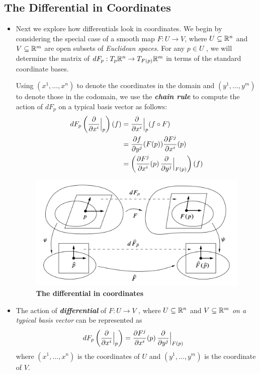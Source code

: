 \documentclass[11pt]{article}
\begin{document}
\subsection{The Differential in Coordinates}
\begin{itemize}
\item Next we explore how differentials look in coordinates. We begin by considering the special case of a smooth map $F: U \rightarrow V$, where $U \subseteq {\mathbb R}^n$ and $V \subseteq {\mathbb R}^m$ are open subsets of \emph{Euclidean spaces}.  For any $p \in U$ , we will determine the matrix of $dF_p: T_{p}{\mathbb R}^n \rightarrow T_{F(p)}{\mathbb R}^m$ in terms of the standard coordinate bases.

Using $(x^1,\ldots, x^n)$ to denote the coordinates in the domain and $(y^1,\ldots, y^m)$ to denote those in the codomain, we use the \emph{\textbf{chain rule}} to compute the action of $dF_p$ on a typical basis vector as follows:
\begin{align*}
dF_p\left(\frac{\partial }{ \partial x^{i}}\Bigr|_{p}\right)(f) &= \frac{\partial }{ \partial x^{i}}\Bigr|_{p} (f \circ F) \\
&= \frac{\partial f}{ \partial y^{j}}(F(p)) \frac{\partial F^{j}}{ \partial x^{i}}(p) \\
&= \left(\frac{\partial F^{j}}{ \partial x^{i}}(p)\,\frac{\partial }{ \partial y^{j}}\Bigr|_{F(p)}\right)(f) 
\end{align*}

\begin{figure}
\begin{minipage}[t]{1\linewidth}
  \centering
  \centerline{\includegraphics[scale = 0.5]{differential_coordinate.png}}
\end{minipage}
\caption{\footnotesize{\textbf{The differential in coordinates \citep{lee2003introduction}}}}
\label{fig: differential_coordinate}
\end{figure}

\item \begin{definition}
The action of \emph{\textbf{differential}} of $F: U \rightarrow V$ , where $U \subseteq {\mathbb R}^n$ and $V \subseteq {\mathbb R}^m$ \emph{on a typical basis vector} can be represented as
\begin{align}
dF_p\left(\frac{\partial }{ \partial x^{i}}\Bigr|_{p}\right) &= \frac{\partial F^{j}}{ \partial x^{i}}(p)\,\frac{\partial }{ \partial y^{j}}\Bigr|_{F(p)} \label{eqn: differential_coordinate}
\end{align} where $(x^1,\ldots, x^n)$ is the coordinates of $U$ and $(y^1,\ldots, y^m)$ is the coordinate of $V$.
\end{definition} 


\end{itemize}
\end{document}
